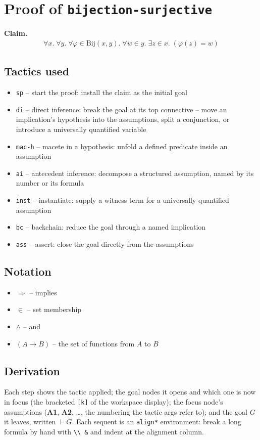 \documentclass[11pt]{article}
\begin{document}
\section*{Proof of \texttt{bijection-surjective}}
\textbf{Claim.}
\begin{align*}
  \forall x.\; \forall y.\; \forall \varphi \in \mathrm{Bij}(x, y).\; \forall w \in y.\; \exists z \in x.\; (\varphi(z) = w)
\end{align*}
\bigskip

\subsection*{Tactics used}
\begin{itemize}
\item \texttt{sp} -- start the proof: install the claim as the initial goal
\item \texttt{di} -- direct inference: break the goal at its top connective -- move an implication's hypothesis into the assumptions, split a conjunction, or introduce a universally quantified variable
\item \texttt{mac-h} -- macete in a hypothesis: unfold a defined predicate inside an assumption
\item \texttt{ai} -- antecedent inference: decompose a structured assumption, named by its number or its formula
\item \texttt{inst} -- instantiate: supply a witness term for a universally quantified assumption
\item \texttt{bc} -- backchain: reduce the goal through a named implication
\item \texttt{ass} -- assert: close the goal directly from the assumptions
\end{itemize}

\subsection*{Notation}
\begin{itemize}
\item $\Rightarrow$ -- implies
\item $\in$ -- set membership
\item $\wedge$ -- and
\item $(A \to B)$ -- the set of functions from $A$ to $B$
\end{itemize}

\subsection*{Derivation}
Each step shows the tactic applied; the goal nodes it opens and which one is now in focus (the bracketed \texttt{[k]} of the workspace display); the focus node's assumptions (\textbf{A1}, \textbf{A2}, \dots{}, the numbering the tactic args refer to); and the goal $G$ it leaves, written $\vdash G$.  Each sequent is an \texttt{align*} environment: break a long formula by hand with \texttt{\textbackslash\textbackslash\ \&} and indent at the alignment column.
\end{document}

